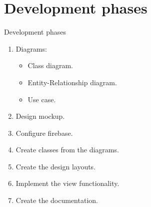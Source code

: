 \documentclass[12pt]{beamer}
\begin{document}
\section{Development phases}
\begin{frame}{Development phases}

\begin{enumerate}
\item Diagrams:

\begin{itemize}
\item Class diagram.
\item Entity-Relationship diagram.
\item Use case.
\end{itemize}

\item Design mockup.

\item Configure firebase.

\item Create classes from the diagrams.

\item Create the design layouts.

\item Implement the view functionality.

\item Create the documentation.

\end{enumerate}
\end{frame}
\end{document}
